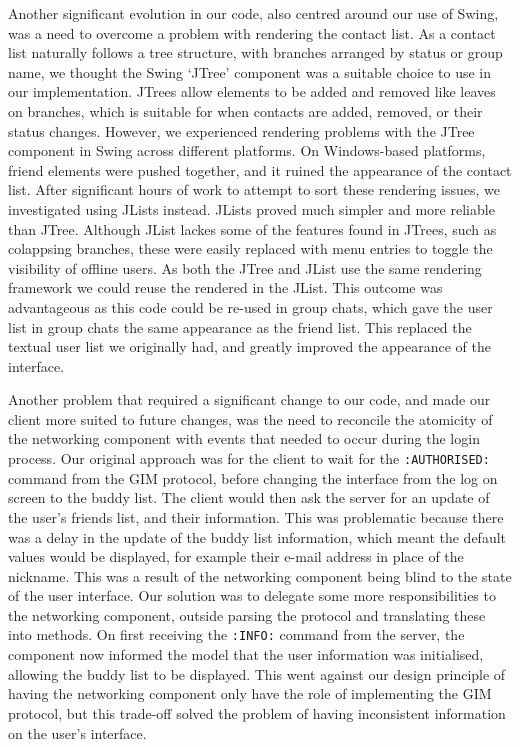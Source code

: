 Another significant evolution in our code, also centred around our use of Swing, was a need to overcome a problem with rendering the contact list. As a contact list naturally follows a tree structure, with branches arranged by status or group name, we thought the Swing `JTree' component was a suitable choice to use in our implementation. JTrees allow elements to be added and removed like leaves on branches, which is suitable for when contacts are added, removed, or their status changes. However, we experienced rendering problems with the JTree component in Swing across different platforms. On Windows-based platforms, friend elements were pushed together, and it ruined the appearance of the contact list. After significant hours of work to attempt to sort these rendering issues, we investigated using JLists instead. JLists proved much simpler and more reliable than JTree. Although JList lackes some of the features found in JTrees, such as colappsing branches, these were easily replaced with menu entries to toggle the visibility of offline users. As both the JTree and JList use the same rendering framework we could reuse the rendered in the JList. This outcome was advantageous as this code could be re-used in group chats, which gave the user list in group chats the same appearance as the friend list. This replaced the textual user list we originally had, and greatly improved the appearance of the interface.  

Another problem that required a significant change to our code, and made our client more suited to future changes, was the need to reconcile the atomicity of the networking component with events that needed to occur during the login process. Our original approach was for the client to wait for the \texttt{:AUTHORISED:} command from the GIM protocol, before changing the interface from the log on screen to the buddy list. The client would then ask the server for an update of the user's friends list, and their information. This was problematic because there was a delay in the update of the buddy list information, which meant the default values would be displayed, for example their e-mail address in place of the nickname. This was a result of the networking component being blind to the state of the user interface. Our solution was to delegate some more responsibilities to the networking  component, outside parsing the protocol and translating these into methods. On first receiving the \texttt{:INFO:} command from the server, the component now informed the model that the user information was initialised, allowing the buddy list to be displayed. This went against our design principle of having the networking component only have the role of implementing the GIM protocol, but this trade-off solved the problem of having inconsistent information on the user's interface.

